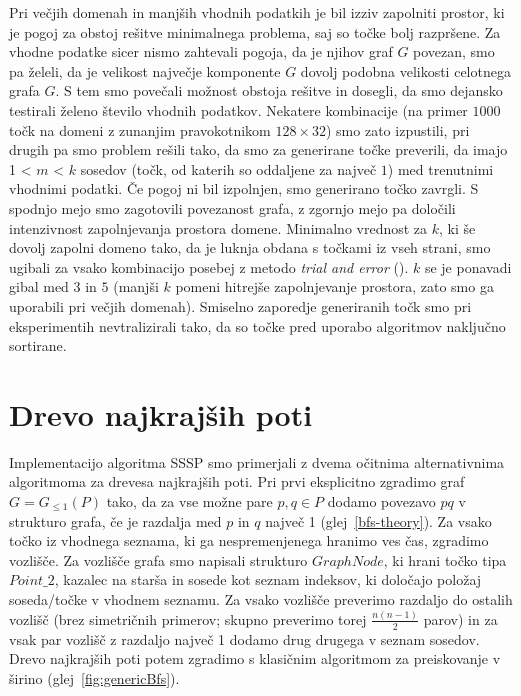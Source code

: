 \documentclass[a4paper, 12pt]{book}
\newcommand{\GG}{\ensuremath{G_{\le 1}}}
\newcommand{\U}{\texttt{\_}}
\begin{document}
Pri večjih domenah in manjših vhodnih podatkih je bil izziv zapolniti prostor, ki je pogoj za obstoj rešitve minimalnega problema, saj so točke bolj razpršene. Za vhodne podatke sicer nismo zahtevali pogoja, da je njihov graf $G$ povezan, smo pa želeli, da je velikost največje komponente $G$ dovolj podobna velikosti celotnega grafa $G$. S tem smo povečali možnost obstoja rešitve in dosegli, da smo dejansko testirali želeno število vhodnih podatkov. Nekatere kombinacije (na primer $1000$ točk na domeni z zunanjim pravokotnikom $128\times 32$) smo zato izpustili, pri drugih pa smo problem rešili tako, da smo za generirane točke preverili, da imajo 1 < $m$ <  $k$ sosedov (točk, od katerih so oddaljene za največ $1$) med trenutnimi vhodnimi podatki. Če pogoj ni bil izpolnjen, smo generirano točko zavrgli. S spodnjo mejo smo zagotovili povezanost grafa, z zgornjo mejo pa določili intenzivnost zapolnjevanja prostora domene. Minimalno vrednost za $k$, ki še dovolj zapolni domeno tako, da je luknja obdana s točkami iz vseh strani,  smo ugibali za vsako kombinacijo posebej z metodo \textit{trial and error} (). $k$ se je ponavadi gibal med $3$ in $5$ (manjši $k$ pomeni hitrejše zapolnjevanje prostora, zato smo ga uporabili pri večjih domenah). Smiselno zaporedje generiranih točk smo pri eksperimentih nevtralizirali tako, da so točke pred uporabo algoritmov naključno sortirane.

\section{Drevo najkrajših poti}
Implementacijo algoritma SSSP smo primerjali z dvema očitnima alternativnima algoritmoma za drevesa najkrajših poti. Pri prvi eksplicitno zgradimo graf $G=\GG(P)$ tako, da za vse možne pare $p, q\in P$ dodamo povezavo $pq$ v strukturo grafa, če je razdalja med $p$ in $q$ največ 1 (glej~\ref{bfs-theory}). Za vsako točko iz vhodnega seznama, ki ga nespremenjenega hranimo ves čas, zgradimo vozlišče. Za vozlišče grafa smo napisali strukturo $GraphNode$, ki hrani točko tipa $Point\U 2$, kazalec na starša in sosede kot seznam indeksov, ki določajo položaj soseda/točke v vhodnem seznamu. Za vsako vozlišče preverimo razdaljo do ostalih vozlišč (brez simetričnih primerov; skupno preverimo torej $\frac{n(n-1)}{2}$ parov) in za vsak par vozlišč z razdaljo največ 1 dodamo drug drugega v seznam sosedov. Drevo najkrajših poti potem zgradimo s klasičnim algoritmom za preiskovanje v širino (glej~\ref{fig:genericBfs}). 
\end{document}
